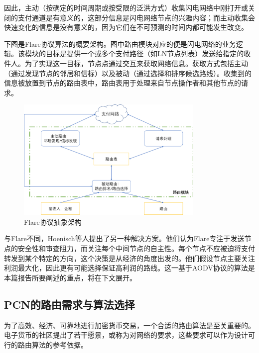 \documentclass[12pt,a4paper]{article}
\begin{document}
因此，主动（按确定的时间周期或按受限的泛洪方式）收集闪电网络中刚打开或关闭的支付通道是有意义的，这部分信息是闪电网络节点的兴趣内容；而主动收集会快速变化的信息是没有意义的，因为它们在不可预测的时间内都可能发生改变。

下图是Flare协议算法的概要架构。图中路由模块对应的便是闪电网络的业务逻辑。该模块的目标是提供一个或多个支付路径（如LN节点列表）发送给指定的收件人。为了实现这一目标，节点点通过交互来获取网络信息。获取方式包括主动（通过发现节点的邻居和信标）以及被动（通过选择和排序候选路线）。收集到的信息被放置到节点的路由表中，路由表用于处理来自节点操作者和其他节点的请求。

\begin{figure}[htb]
\centering
\includegraphics[width=9cm]{high_level_flare}
\caption{Flare协议抽象架构}
\end{figure}

与Flare不同，Hoenisch等人提出了另一种解决方案\cite{hoenisch2018aodv}。他们认为Flare专注于发送节点的安全性和审查阻力，而\cite{hoenisch2018aodv}关注每个中间节点的自主性。每个节点不应被迫将支付转发到某个特定的方向，这个决策是从经济的角度出发的。他们假设节点主要关注利润最大化，因此更有可能选择保证高利润的路线。这一基于AODV协议的算法是本篇报告所要阐述的重点，将在下文展开。

\subsection{PCN的路由需求与算法选择}
为了高效、经济、可靠地进行加密货币交易，一个合适的路由算法是至关重要的。电子货币的社区提出了若干愿景\cite{beliefs}，或称为对网络的要求，这些要求可以作为设计可行的路由算法的参考依据。
\end{document}
